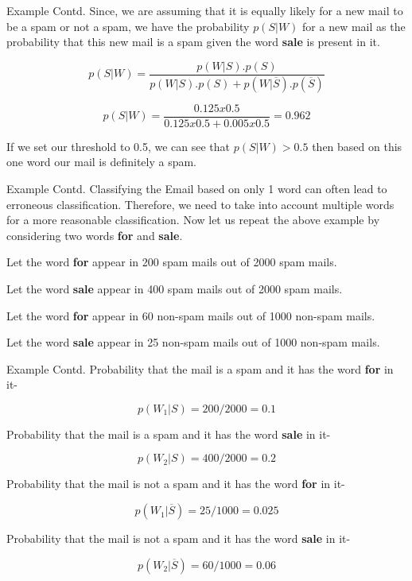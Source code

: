 \begin{frame}{Example Contd.}
Since, we are assuming that it is equally likely for a new mail to be a spam or not a spam, we have the probability $p(S|W)$ for a new mail as the probability that this new mail is a spam given the word \textbf{sale} is present in it.

$$
p(S|W) = \dfrac{p(W|S).p(S)}{p(W|S).p(S) + p(W|\overline{S}).p(\overline{S})}
$$

$$
p(S|W) = \dfrac{0.125 x 0.5}{0.125 x 0.5 + 0.005 x0.5} = 0.962
$$

If we set our threshold to 0.5, we can see that $p(S|W) > 0.5$ then based on this one word our mail is definitely a spam.
\end{frame}

\begin{frame}{Example Contd.}
Classifying the Email based on only 1 word can often lead to erroneous classification. Therefore, we need to take into account multiple words for a more reasonable classification. Now let us repeat the above example by considering two words \textbf{for} and \textbf{sale}.

\vspace{5mm}

Let the word \textbf{for} appear in 200 spam mails out of 2000 spam mails.

Let the word \textbf{sale} appear in 400 spam mails out of 2000 spam mails.

\vspace{5mm}

Let the word \textbf{for} appear in 60 non-spam mails out of 1000 non-spam mails.

Let the word \textbf{sale} appear in 25 non-spam mails out of 1000 non-spam mails.

\end{frame}

\begin{frame}{Example Contd.}
Probability that the mail is a spam and it has the word \textbf{for} in it-

$$
p(W_1|S) = 200/2000 = 0.1
$$

Probability that the mail is a spam and it has the word \textbf{sale} in it-

$$
p(W_2|S) = 400/2000 = 0.2
$$

Probability that the mail is not a spam and it has the word \textbf{for} in it-

$$
p(W_1|\overline{S}) = 25/1000 = 0.025
$$

Probability that the mail is not a spam and it has the word \textbf{sale} in it-

$$
p(W_2|\overline{S}) = 60/1000 = 0.06
$$
\end{frame}

